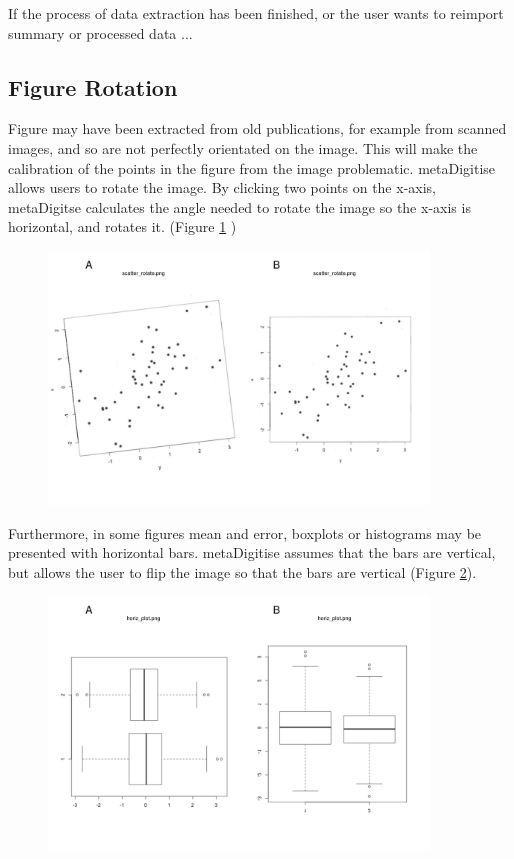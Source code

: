 \documentclass{article}
\begin{document}
If the process of data extraction has been finished, or the user wants to reimport summary or processed data ...






\subsection{Figure Rotation}
Figure may have been extracted from old publications, for example from scanned images, and so are not perfectly orientated on the image. This will make the calibration of the points in the figure from the image problematic. metaDigitise allows users to rotate the image. By clicking two points on the x-axis, metaDigitse calculates the angle needed to rotate the image so the x-axis is horizontal, and rotates it. (Figure \ref{fig:rotate} )

\begin{figure}[!h] 
 \includegraphics[width=0.9\textwidth]{fig_rotate.pdf} 
 \caption{ }
\label{fig:rotate}
\end{figure}

Furthermore, in some figures mean and error, boxplots or histograms may be presented with horizontal bars. metaDigitise assumes that the bars are vertical, but allows the user to flip the image so that the bars are vertical (Figure \ref{fig:flip}).

\begin{figure}[!h] 
 \includegraphics[width=0.9\textwidth]{fig_flip.pdf} 
 \caption{ }
\label{fig:flip}
\end{figure}
\end{document}
